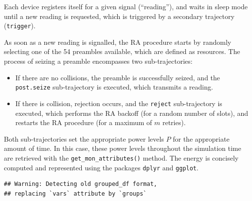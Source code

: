\documentclass[twoside,nohyper]{tufte-book}
\newenvironment{Shaded}{}{}
\newcommand{\CommentTok}[1]{\textcolor[rgb]{0.38,0.63,0.69}{\textit{#1}}}
\newcommand{\DataTypeTok}[1]{\textcolor[rgb]{0.56,0.13,0.00}{#1}}
\newcommand{\DecValTok}[1]{\textcolor[rgb]{0.25,0.63,0.44}{#1}}
\newcommand{\KeywordTok}[1]{\textcolor[rgb]{0.00,0.44,0.13}{\textbf{#1}}}
\newcommand{\NormalTok}[1]{#1}
\newcommand{\OperatorTok}[1]{\textcolor[rgb]{0.40,0.40,0.40}{#1}}
\newcommand{\OtherTok}[1]{\textcolor[rgb]{0.00,0.44,0.13}{#1}}
\newcommand{\StringTok}[1]{\textcolor[rgb]{0.25,0.44,0.63}{#1}}
\providecommand{\tightlist}{%
  \setlength{\itemsep}{0pt}\setlength{\parskip}{0pt}}
\begin{document}
Each device registers itself for a given signal (``reading''), and waits in sleep mode until a new reading is requested, which is triggered by a secondary trajectory (\texttt{trigger}).

\begin{Shaded}
\end{Shaded}

As soon as a new reading is signalled, the RA procedure starts by randomly selecting one of the 54 preambles available, which are defined as resources. The process of seizing a preamble encompasses two sub-trajectories:

\begin{itemize}
\tightlist
\item
  If there are no collisions, the preamble is successfully seized, and the \texttt{post.seize} sub-trajectory is executed, which transmits a reading.
\item
  If there is collision, rejection occurs, and the \texttt{reject} sub-trajectory is executed, which performs the RA backoff (for a random number of slots), and restarts the RA procedure (for a maximum of \(m\) retries).
\end{itemize}

Both sub-trajectories set the appropriate power levels \(P\) for the appropriate amount of time. In this case, these power levels throughout the simulation time are retrieved with the \texttt{get\_mon\_attributes()} method. The energy is concisely computed and represented using the packages \texttt{dplyr}\cite[0pt]{CRAN:dplyr} and \texttt{ggplot}\cite[0pt]{CRAN:ggplot2}.



\begin{verbatim}
## Warning: Detecting old grouped_df format,
## replacing `vars` attribute by `groups`
\end{verbatim}
\end{document}
